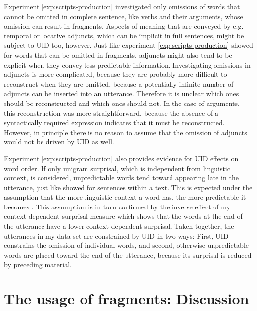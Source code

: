 Experiment \ref{exp:scripts-production} investigated only omissions of words that cannot be omitted in complete sentence, like verbs and their arguments, whose omission can result in fragments. Aspects of meaning that are conveyed by e.g. temporal or locative adjuncts, which can be implicit in full sentences, might be subject to UID too, however. Just like experiment \ref{exp:scripts-production} showed for words that can be omitted in fragments, adjuncts might also tend to be explicit when they convey less predictable information. Investigating omissions in adjuncts is more complicated, because they are probably more difficult to reconstruct when they are omitted, because a potentially infinite number of adjuncts can be inserted into an utterance. Therefore it is unclear which ones should be reconstructed and which ones should not. In the case of arguments, this reconstruction was more straightforward, because the absence of a syntactically required expression indicates that it must be reconstructed. However, in principle there is no reason to assume that the omission of adjuncts would not be driven by UID as well.

Experiment \ref{exp:scripts-production} also provides evidence for UID effects on word order. If only unigram surprisal, which is independent from linguistic context, is considered, unpredictable words tend toward appearing late in the utterance, just like \citet{genzel.charniak2002} showed for sentences within a text. This is expected under the assumption that the more linguistic context a word has, the more predictable it becomes \citep{genzel.charniak2002, levy2008}. This assumption is in turn confirmed by the inverse effect of my context-dependent surprisal measure which shows that the words at the end of the utterance have a lower context-dependent surprisal. Taken together, the utterances in my data set are constrained by UID in two ways: First, UID constrains the omission of individual words, and second, otherwise unpredictable words are placed toward the end of the utterance, because its surprisal is reduced by preceding material.

\section{The usage of fragments: Discussion}
\label{sec:scripts-discussion}

